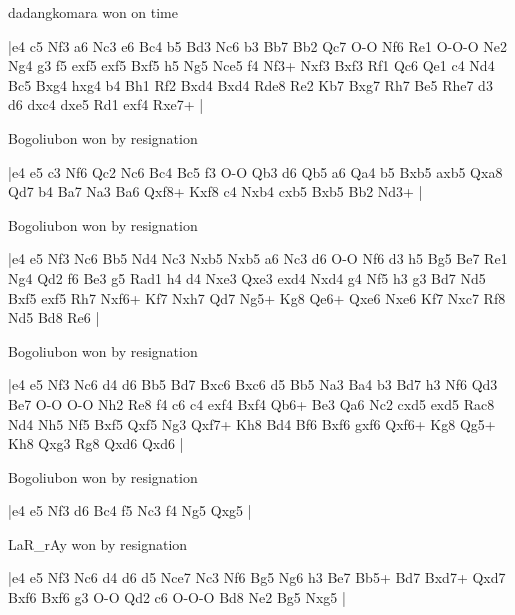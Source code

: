 \showboard

dadangkomara won on time

\makegametitle
|e4 c5 Nf3 a6 Nc3 e6 Bc4 b5 Bd3 Nc6 b3 Bb7 Bb2 Qc7 O-O Nf6 Re1 O-O-O Ne2 Ng4 g3 f5 exf5 exf5 Bxf5 h5 Ng5 Nce5 f4 Nf3+ Nxf3 Bxf3 Rf1 Qc6 Qe1 c4 Nd4 Bc5 Bxg4 hxg4 b4 Bh1 Rf2 Bxd4 Bxd4 Rde8 Re2 Kb7 Bxg7 Rh7 Be5 Rhe7 d3 d6 dxc4 dxe5 Rd1 exf4 Rxe7+  |

\showboard

Bogoliubon won by resignation

\makegametitle
|e4 e5 c3 Nf6 Qc2 Nc6 Bc4 Bc5 f3 O-O Qb3 d6 Qb5 a6 Qa4 b5 Bxb5 axb5 Qxa8 Qd7 b4 Ba7 Na3 Ba6 Qxf8+ Kxf8 c4 Nxb4 cxb5 Bxb5 Bb2 Nd3+  |

\showboard

Bogoliubon won by resignation

\makegametitle
|e4 e5 Nf3 Nc6 Bb5 Nd4 Nc3 Nxb5 Nxb5 a6 Nc3 d6 O-O Nf6 d3 h5 Bg5 Be7 Re1 Ng4 Qd2 f6 Be3 g5 Rad1 h4 d4 Nxe3 Qxe3 exd4 Nxd4 g4 Nf5 h3 g3 Bd7 Nd5 Bxf5 exf5 Rh7 Nxf6+ Kf7 Nxh7 Qd7 Ng5+ Kg8 Qe6+ Qxe6 Nxe6 Kf7 Nxc7 Rf8 Nd5 Bd8 Re6  |

\showboard

Bogoliubon won by resignation

\makegametitle
|e4 e5 Nf3 Nc6 d4 d6 Bb5 Bd7 Bxc6 Bxc6 d5 Bb5 Na3 Ba4 b3 Bd7 h3 Nf6 Qd3 Be7 O-O O-O Nh2 Re8 f4 c6 c4 exf4 Bxf4 Qb6+ Be3 Qa6 Nc2 cxd5 exd5 Rac8 Nd4 Nh5 Nf5 Bxf5 Qxf5 Ng3 Qxf7+ Kh8 Bd4 Bf6 Bxf6 gxf6 Qxf6+ Kg8 Qg5+ Kh8 Qxg3 Rg8 Qxd6 Qxd6  |

\showboard

Bogoliubon won by resignation

\makegametitle
|e4 e5 Nf3 d6 Bc4 f5 Nc3 f4 Ng5 Qxg5  |

\showboard

LaR\_rAy won by resignation

\makegametitle
|e4 e5 Nf3 Nc6 d4 d6 d5 Nce7 Nc3 Nf6 Bg5 Ng6 h3 Be7 Bb5+ Bd7 Bxd7+ Qxd7 Bxf6 Bxf6 g3 O-O Qd2 c6 O-O-O Bd8 Ne2 Bg5 Nxg5  |

